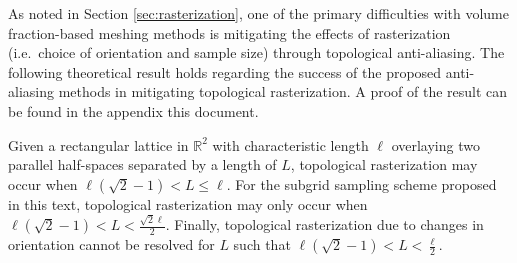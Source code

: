 As noted in Section \ref{sec:rasterization}, one of the primary difficulties with volume fraction-based meshing methods is mitigating the effects of rasterization (i.e.\ choice of orientation and sample size) through topological anti-aliasing.
The following theoretical result holds regarding the success of the proposed anti-aliasing methods in mitigating topological rasterization.
 A proof of the result can be found in the appendix this document.
\begin{theorem}
Given a rectangular lattice in $\mathbb{R}^2$ with characteristic length $\ell$ overlaying two parallel half-spaces separated by a length of $L$, topological rasterization may occur when $\ell(\sqrt{2}-1)<L\leq\ell$.
For the subgrid sampling scheme proposed in this text, topological rasterization may only occur when $\ell(\sqrt{2}-1)<L<\frac{\sqrt{2}\ell}{2}.$
Finally, topological rasterization due to changes in orientation cannot be resolved for $L$ such that $\ell(\sqrt{2}-1)<L<\frac{\ell}{2}.$
\end{theorem}


